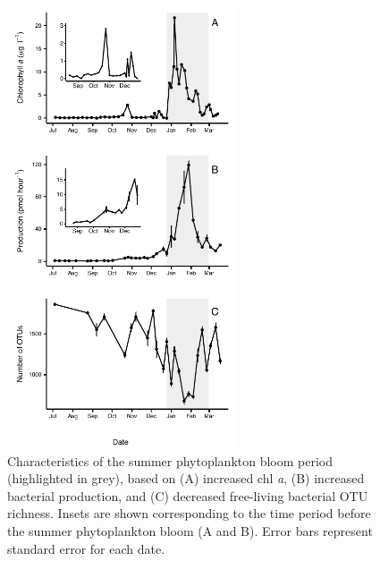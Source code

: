 \begin{figure}[ht!] 
\centering 
\includegraphics[width=0.6\textwidth]{Chapter_3_SWI/Figures/Figure_1_Chla_BP_richness} 
\caption[Changes in chlorophyll \emph{a}, bacterial production, and OTU richness over the nine-month time series.]{Characteristics of the summer phytoplankton bloom period (highlighted in grey), based on (A) increased chl \emph{a}, (B) increased bacterial production, and (C) decreased free-living bacterial OTU richness. Insets are shown corresponding to the time period before the summer phytoplankton bloom (A and B). Error bars represent standard error for each date.} 
\label{fig:chla_bp_richness} 
\end{figure}

